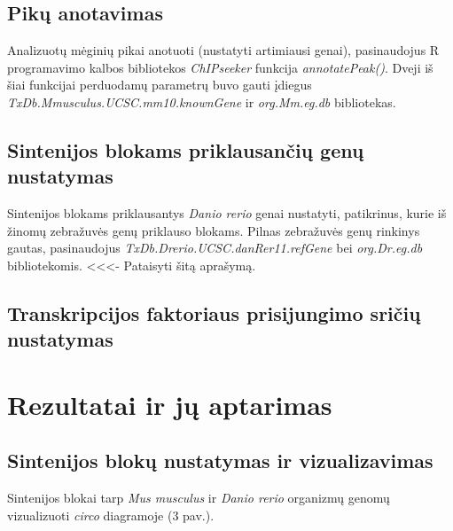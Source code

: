 \documentclass[12pt]{article}
\begin{document}
\subsection{Pikų anotavimas}
Analizuotų mėginių pikai anotuoti (nustatyti artimiausi genai), pasinaudojus R
programavimo kalbos bibliotekos \emph{ChIPseeker}\cite{CHIP1, CHIP2} funkcija
\emph{annotatePeak()}. Dveji iš šiai funkcijai perduodamų parametrų buvo gauti
įdiegus \emph{TxDb.Mmusculus.UCSC.mm10.knownGene}\cite{KNOWN_GENE}
ir \emph{org.Mm.eg.db}\cite{MM_ANNOT} bibliotekas.

\subsection{Sintenijos blokams priklausančių genų nustatymas}
Sintenijos blokams priklausantys \emph{Danio rerio} genai nustatyti,
patikrinus, kurie iš žinomų zebražuvės genų priklauso blokams. Pilnas zebražuvės
genų rinkinys gautas, pasinaudojus \emph{TxDb.Drerio.UCSC.danRer11.refGene} bei
\emph{org.Dr.eg.db} bibliotekomis. <<<- Pataisyti šitą aprašymą.

\subsection{Transkripcijos faktoriaus prisijungimo sričių nustatymas}

\newpage


\section{Rezultatai ir jų aptarimas}
\subsection{Sintenijos blokų nustatymas ir vizualizavimas}

Sintenijos blokai tarp \emph{Mus musculus} ir \emph{Danio rerio} organizmų
genomų vizualizuoti \emph{circo} diagramoje (3 pav.).
\end{document}

